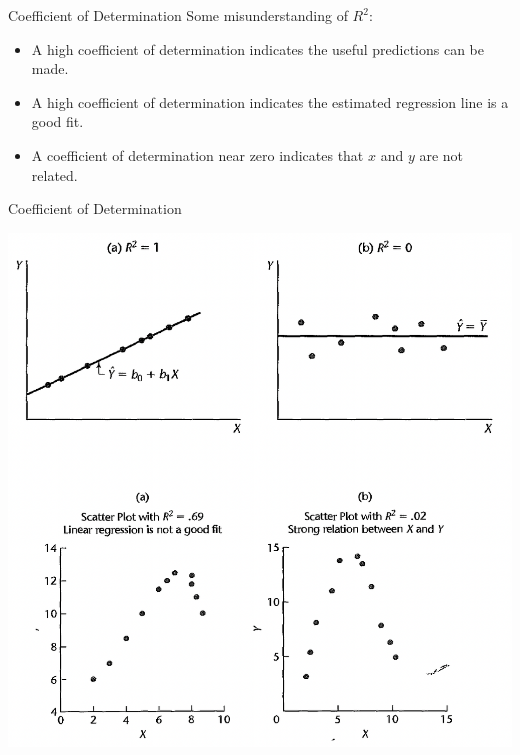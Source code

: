 \documentclass[
  ignorenonframetext,
]{beamer}
\begin{document}
\begin{frame}{Coefficient of Determination}
\protect\hypertarget{coefficient-of-determination-1}{}
Some misunderstanding of \(R^2\):

\begin{itemize}
\item
  A high coefficient of determination indicates the useful predictions
  can be made.
\item
  A high coefficient of determination indicates the estimated regression
  line is a good fit.
\item
  A coefficient of determination near zero indicates that \(x\) and
  \(y\) are not related.
\end{itemize}
\end{frame}

\begin{frame}{Coefficient of Determination}
\protect\hypertarget{coefficient-of-determination-2}{}
\small

\begin{center}\includegraphics[width=0.6\linewidth]{week2_7} \end{center}
\normalsize
\end{frame}
\end{document}
